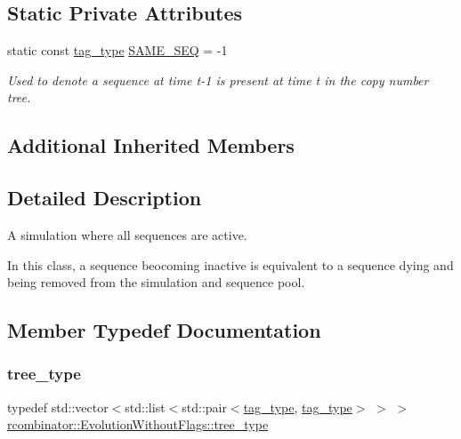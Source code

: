 \subsection*{Static Private Attributes}
\begin{DoxyCompactItemize}
\item 
\mbox{\label{classrcombinator_1_1EvolutionWithoutFlags_adce1690abcb604435e5d0d1861555e57}} 
static const \mbox{\hyperlink{constants_8h_a3e6daf1646e952257330d8cfe20e96f8}{tag\+\_\+type}} \mbox{\hyperlink{classrcombinator_1_1EvolutionWithoutFlags_adce1690abcb604435e5d0d1861555e57}{S\+A\+M\+E\+\_\+\+S\+EQ}} = -\/1
\begin{DoxyCompactList}\small\item\em Used to denote a sequence at time {\itshape t-\/1} is present at time {\itshape t} in the copy number tree. \end{DoxyCompactList}\end{DoxyCompactItemize}
\subsection*{Additional Inherited Members}


\subsection{Detailed Description}
A simulation where all sequences are active. 

In this class, a sequence beocoming inactive is equivalent to a sequence dying and being removed from the simulation and sequence pool. 

\subsection{Member Typedef Documentation}
\mbox{\label{classrcombinator_1_1EvolutionWithoutFlags_a5c2d91575aad05a457c00ee897e3bdc1}} 
\subsubsection{\texorpdfstring{tree\+\_\+type}{tree\_type}}
{\footnotesize\ttfamily typedef std\+::vector$<$std\+::list$<$std\+::pair$<$\mbox{\hyperlink{constants_8h_a3e6daf1646e952257330d8cfe20e96f8}{tag\+\_\+type}}, \mbox{\hyperlink{constants_8h_a3e6daf1646e952257330d8cfe20e96f8}{tag\+\_\+type}}$>$ $>$ $>$ \mbox{\hyperlink{classrcombinator_1_1EvolutionWithoutFlags_a5c2d91575aad05a457c00ee897e3bdc1}{rcombinator\+::\+Evolution\+Without\+Flags\+::tree\+\_\+type}}}



